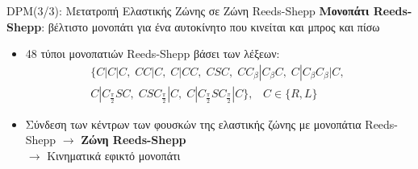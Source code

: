 \documentclass[10pt, compress]{beamer}
\begin{document}
\begin{frame}{DPM(3/3): Μετατροπή Ελαστικής Ζώνης σε Ζώνη Reeds-Shepp}
\textbf{Μονοπάτι Reeds-Shepp}: βέλτιστο μονοπάτι για ένα αυτοκίνητο που κινείται και μπρος και πίσω
	\begin{itemize}
		\item 48 τύποι μονοπατιών Reeds-Shepp βάσει των λέξεων:\\[-0.8cm] 
			\begin{align*}
	\{C|C|C,\;CC|C,\;C|CC,\;CSC,\;CC_{\beta}|C_{\beta}C,\;	C|C_{\beta}C_{\beta}|C,\;\nonumber\\C|C_{\frac{\pi}{2}}SC,\;CSC_{\frac{\pi}{2}}|C,\;C|C_{\frac{\pi}{2}}SC_{\frac{\pi}2}|C\},\;\;\; C \in \{R,L\}
			\end{align*}

		\item Σύνδεση των κέντρων των φουσκών της ελαστικής ζώνης με μονοπάτια Reeds-Shepp
		$\rightarrow$ \textbf{Ζώνη Reeds-Shepp}\\
		$\rightarrow$ Κινηματικά εφικτό μονοπάτι
	\end{itemize}
	\vspace{-0.5cm}
	\begin{figure}
		\captionsetup[subfigure]{labelformat=empty}
		 \hspace{0.1cm}
		 \hspace{0.1cm}
	\end{figure}
\end{frame}
\end{document}
